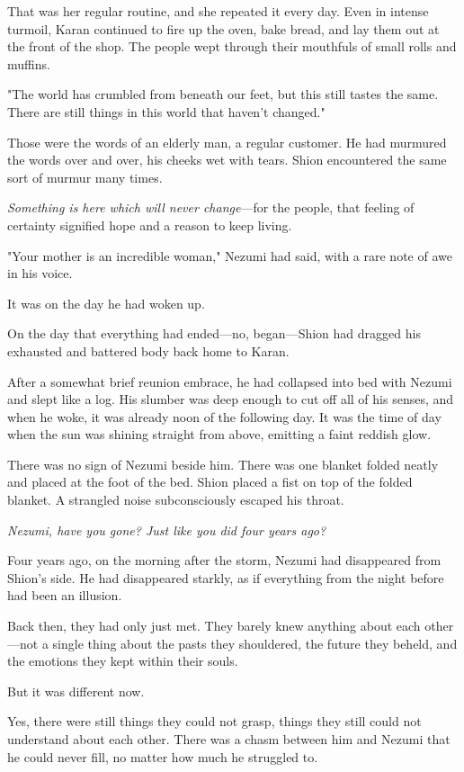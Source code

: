 That was her regular routine, and she repeated it every day. Even in
intense turmoil, Karan continued to fire up the oven, bake bread, and
lay them out at the front of the shop. The people wept through their
mouthfuls of small rolls and muffins.

"The world has crumbled from beneath our feet, but this still tastes the
same. There are still things in this world that haven't changed."

Those were the words of an elderly man, a regular customer. He had
murmured the words over and over, his cheeks wet with tears. Shion
encountered the same sort of murmur many times.

\emph{Something is here which will never change}---for the people, that feeling
of certainty signified hope and a reason to keep living.

"Your mother is an incredible woman," Nezumi had said, with a rare note
of awe in his voice.

It was on the day he had woken up.

On the day that everything had ended---no, began---Shion had dragged his
exhausted and battered body back home to Karan.

After a somewhat brief reunion embrace, he had collapsed into bed with
Nezumi and slept like a log. His slumber was deep enough to cut off all
of his senses, and when he woke, it was already noon of the following
day. It was the time of day when the sun was shining straight from
above, emitting a faint reddish glow.

There was no sign of Nezumi beside him. There was one blanket folded
neatly and placed at the foot of the bed. Shion placed a fist on top of
the folded blanket. A strangled noise subconsciously escaped his throat.

\emph{Nezumi, have you gone? Just like you did four years ago?}

Four years ago, on the morning after the storm, Nezumi had disappeared
from Shion's side. He had disappeared starkly, as if everything from the
night before had been an illusion.

Back then, they had only just met. They barely knew anything about each
other---not a single thing about the pasts they shouldered, the future
they beheld, and the emotions they kept within their souls.

But it was different now.

Yes, there were still things they could not grasp, things they still
could not understand about each other. There was a chasm between him and
Nezumi that he could never fill, no matter how much he struggled to.

